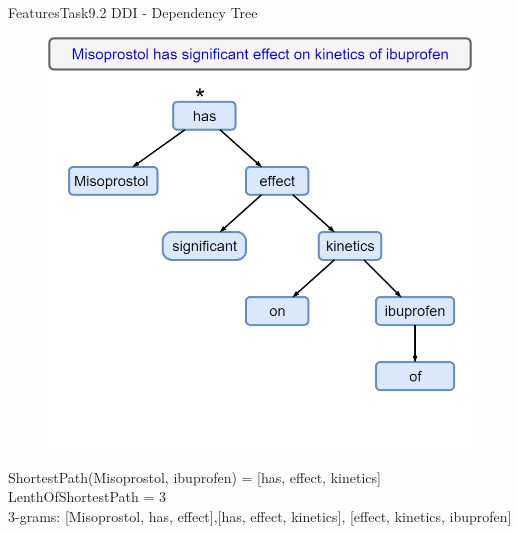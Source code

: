 \documentclass[xcolor=table]{beamer}
\begin{document}
\begin{frame}{Features}{Task9.2 DDI - Dependency Tree}
\begin{figure}
\includegraphics[scale=0.2]{tree.png}
\end{figure}
\vspace*{-35pt}
\small{ShortestPath(Misoprostol, ibuprofen) = [has, effect, kinetics]\\
LenthOfShortestPath = 3\\
3-grams: [Misoprostol, has, effect],[has, effect, kinetics], [effect, kinetics, ibuprofen]}
\end{frame}

\end{document}
